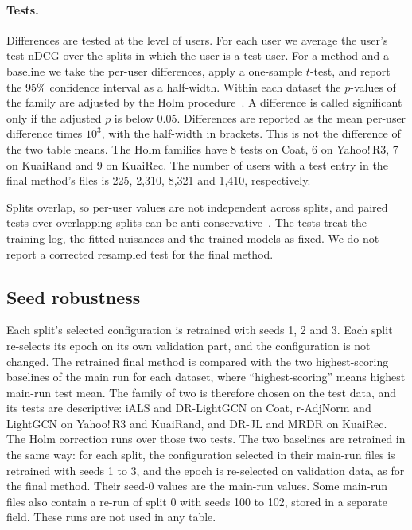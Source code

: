 \paragraph{Tests.}
Differences are tested at the level of users. For each user we average the user's test nDCG over the
splits in which the user is a test user. For a method and a baseline we take the per-user differences,
apply a one-sample $t$-test, and report the 95\% confidence interval as a half-width. Within each
dataset the $p$-values of the family are adjusted by the Holm procedure~\citep{holm1979}. A difference
is called significant only if the adjusted $p$ is below 0.05. Differences are reported as the mean
per-user difference times $10^{3}$, with the half-width in brackets. This is not the difference of the
two table means. The Holm families have 8 tests on Coat, 6 on Yahoo!\,R3, 7 on KuaiRand and 9 on
KuaiRec. The number of users with a test entry in the final method's files is 225, 2{,}310, 8{,}321 and
1{,}410, respectively.

Splits overlap, so per-user values are not independent across splits, and paired tests over
overlapping splits can be anti-conservative~\citep{nadeau2003}. The tests treat the training log, the
fitted nuisances and the trained models as fixed. We do not report a corrected resampled test for the
final method.

\subsection{Seed robustness}\label{sec:seedsetup}

Each split's selected configuration is retrained with seeds 1, 2 and 3. Each split re-selects its
epoch on its own validation part, and the configuration is not changed. The retrained final method is
compared with the two highest-scoring baselines of the main run for each dataset, where ``highest-scoring'' means
highest main-run test mean. The family of two is therefore chosen on the test data, and its tests are descriptive: iALS and DR-LightGCN
on Coat, r-AdjNorm and LightGCN on Yahoo!\,R3 and KuaiRand, and DR-JL and MRDR on KuaiRec. The Holm
correction runs over those two tests. The two baselines are retrained in the same way: for each split, the
configuration selected in their main-run files is retrained with seeds 1 to 3, and the epoch is re-selected on
validation data, as for the final method. Their seed-0 values are the main-run values. Some main-run files also contain a re-run of split 0 with seeds
100 to 102, stored in a separate field. These runs are not used in any table.

